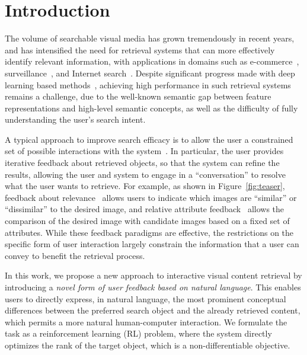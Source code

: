 \section{Introduction}

The volume of searchable visual media has grown tremendously in recent years, and has intensified the need for retrieval systems that can more effectively identify relevant information, with applications in domains such as e-commerce~\cite{huang2015cross,liuLQWTcvpr16DeepFashion},  surveillance~\cite{vaquero2009attribute,shi2015transferring}, and Internet search~\cite{gordo2016deep,jegou2012aggregating}. Despite significant progress made with deep learning based methods~\cite{wang2014learning,gordo2017end}, achieving high performance in such retrieval systems remains a challenge, due to the well-known semantic gap between feature representations and high-level semantic concepts, as well as the difficulty of fully understanding the user's search intent. 

A typical approach to improve search efficacy is to 
allow the user a constrained set of possible interactions with the system~\cite{zhou2003relevance,thomee2012interactive}. 
In particular, the user provides iterative feedback about retrieved 
objects, so that the system can refine the results, allowing the user and system 
to engage in a ``conversation'' to resolve what the user wants to retrieve.
For example, as shown in Figure~\ref{fig:teaser}, feedback about relevance~\cite{rui1998relevance} allows users to indicate which images are ``similar'' or ``dissimilar'' to the 
desired image, and relative attribute feedback~\cite{kovashka2012} allows
the comparison of the desired image with candidate images based on a fixed 
set of attributes. While these feedback paradigms are effective, the restrictions 
on the specific form of user interaction largely constrain the information that a 
user can convey to benefit the retrieval process.

In this work, we propose a new approach to interactive visual content retrieval by 
introducing a {\em novel form of user feedback based on natural language}. 
This enables users to directly express, in natural language, 
the most prominent conceptual differences between the preferred search object and 
the already retrieved content, which permits a more natural human-computer interaction. 
We formulate the task as a reinforcement learning (RL) problem, where the system 
directly optimizes the rank of the target object, which is a non-differentiable objective. 


